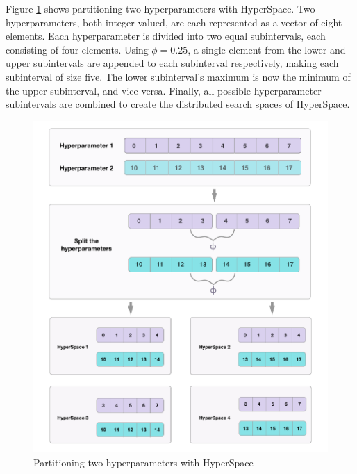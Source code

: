 Figure \ref{fig:hspex} shows partitioning two hyperparameters with HyperSpace. Two hyperparameters, both integer valued, are each represented as a vector of eight elements. 
Each hyperparameter is divided into two equal subintervals, each consisting of four elements. 
Using $\phi = 0.25$, a single element from the lower and upper subintervals are appended to each subinterval respectively, making each subinterval of size five. The lower subinterval's maximum is now the minimum of the upper subinterval, and vice versa. 
Finally, all possible hyperparameter subintervals are combined to create the distributed search
spaces of HyperSpace.
\begin{figure}[h]
	\centering
	\includegraphics[scale=0.43]{figures/hyperspace-example.png}
	\caption{Partitioning two hyperparameters with HyperSpace}
	\label{fig:hspex}
\end{figure}

